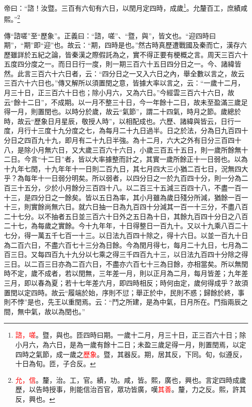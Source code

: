帝曰：“諮！汝暨。三百有六旬有六日，以閏月定四時，成歲\footnote{\textcolor{red}{諮，嗟}。暨，與也。匝四時曰期。一歲十二月，月三十日，正三百六十日；除小月六，為六日，是為一歲有餘十二日；未盈三歲足得一月，則置閏焉，以定四時之氣節，成一歲之\textcolor{red}{歷象}。暨，其器反。期，居其反，下同。旬，似遵反，十日為旬。匝，子合反。}。允釐百工，庶績咸熙。”\footnote{\textcolor{red}{允，信}。釐，治。工，官。績，功。咸，皆。熙，廣也，興也。言定四時成歲歷，以告時授事，則能信治百官，眾功皆廣，嘆\textcolor{red}{其善}。釐，力之反。熙，許其反，興也。}

{\noindent\zhuan{}\fzbyks 傳“諮嗟”至“歷象”。正義曰：“諮，嗟”、“暨，與”，皆文也。“迎四時曰期”，“期”即“迎”也。故云：“期，四時是也。”然古時真歷遭戰國及秦而亡，漢存六歷雖詳於五紀之論，皆秦漢之際假託為之，實不得正要有梗概之言。周天三百六十五度四分度之一。而日日行一度，則一期三百六十五日四分日之一。今、諸緯皆然。此言三百六十六日者，云：“四分日之一又入六日之內，舉全數以言之，故云三百六十六日也。”傳又解所以須置閏之意，皆據大率以言之，云：“一歲十二月，月三十日，正三百六十日也；除小月六，又為六日。”今經雲三百六十六日，故云“餘十二日”，不成期。以一月不整三十日，今一年餘十二日，故未至盈滿三歲足得一月，則置閏也。以時分於歲，故云“氣節”，謂二十四氣，時月之節。歲總於時，故云“歷象日月星辰，敬授人時”，以相配成也。六歷、諸緯與皆云，日行一度，月行十三度十九分度之七，為每月二十九日過半。日之於法，分為日九百四十分日之四百九十九，即月有二十九日半強。為十二月，六大之外有日分三百四十八，是除小月無六日，又大歲三百六十六日，小歲三百五十五日，則一歲所餘無十二日。今言“十二日”者，皆以大率據整而計之，其實一歲所餘正十一日弱也。以為十九年七閏，十九年年十一日則二百九日，其七月四大三小猶二百七日，況無四大乎？為每年十一日弱分明矣。所以弱者，以四分日之一於九百四十分，則一分為二百三十五分，少於小月餘分三百四十八。以二百三十五減三百四十八，不盡一百一十三，是四分日之一餘矣。皆以五日為率，其小月雖為歲日殘分所減，猶餘一百一十三，則實餘尚無六日。就六日抽一日為九百四十分減其一百一十三分，不盡八百二十七分。以不抽者五日並三百六十日外之五日為十日，其餘九百四十分日之八百二十七，為每歲之實餘。今十九年年，十日得整日一百九十。又以十九乘八百二十七分，得一萬五千七百一十三。以日法九百四十除之，得十六日。以並一百九十日為二百六日，不盡六百七十三分為日餘。今為閏月得七，每月二十九日，七月為二百三日。又每四百九十九分以七乘之得三千四百九十三，以日法九百四十分除之得三日。以二百三日亦為二百六日，不盡亦六百七十三為日餘，亦相當矣。所以無閏時不定，歲不成者，若以閏無，三年差一月，則以正月為二月，每月皆差；九年差三月，即以春為夏；若十七年差六月，即四時相反；時何由定，歲何得成乎？故須置閏以定四時。故云“履端於始，序則不愆；舉正於中，民則不惑；歸餘於終，事則不悖”是也，先王以重閏焉。云：“鬥之所建，是為中氣，日月所在。鬥指兩辰之間，無中氣，故以為閏也。” \par}

